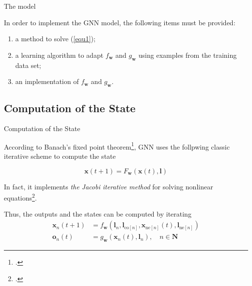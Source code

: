 \documentclass[10pt,aspectratio=169]{beamer}
\begin{document}
\begin{frame}[allowframebreaks]{The model}
    \framebreak

    In order to implement the GNN model, the following items must be provided:

    \begin{enumerate}
        \item a method to solve (\ref{equ1});
        \item a learning algorithm to adapt $f_{\boldsymbol{w}}$ and $g_{\boldsymbol{w}}$ using examples from the training data set;
        \item an implementation of $f_{\boldsymbol{w}}$ and $g_{\boldsymbol{w}}$.
    \end{enumerate}

\end{frame}

\subsection{Computation of the State}
\begin{frame}[allowframebreaks]{Computation of the State}

    According to Banach’s fixed point theorem\footcite{khamsi2011introduction}, GNN uses the follpwing classic iterative scheme to compute the state

    \begin{equation}
        \boldsymbol{x}(t + 1) = F_{\boldsymbol{w}} (\boldsymbol{x}(t), \boldsymbol{l})
    \end{equation}

    In fact, it implements \emph{the Jacobi iterative method} for solving nonlinear equations\footcites{powell1964efficient}.

    Thus, the outputs and the states can be computed by iterating
    \begin{equation}
        \label{equ5}
        \begin{aligned}
            \boldsymbol{x}_{n}(t+1) & =f_{\boldsymbol{w}}\left(\boldsymbol{l}_{n}, \boldsymbol{l}_{\mathrm{co}[n]}, \boldsymbol{x}_{\mathrm{ne}[n]}(t), \boldsymbol{l}_{\mathrm{ne}[n]}\right) \\
            \boldsymbol{o}_{n}(t)   & =g_{\boldsymbol{w}}\left(\boldsymbol{x}_{n}(t), \boldsymbol{l}_{n}\right), \quad n \in \boldsymbol{N}
        \end{aligned}
    \end{equation}
\end{frame}
\end{document}
